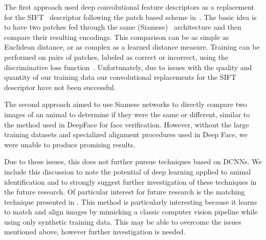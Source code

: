         The first approach used deep convolutional feature descriptors as a replacement for the
        SIFT~\cite{lowe_distinctive_2004} descriptor following the patch based scheme
        in~\cite{zagoruyko_learning_2015}. The basic idea is to have two patches fed through the same
        (Siamese)~\cite{chopra_learning_2005} architecture and then compare their resulting encodings. This
        comparison can be as simple as Euclidean distance, or as complex as a learned distance measure. Training
        can be performed on pairs of patches, labeled as correct or incorrect, using the discriminative loss
        function~\cite{lecun_loss_2005}. Unfortunately, due to issues with the quality and quantity of our training
        data our convolutional replacements for the SIFT descriptor have not been successful.

        The second approach aimed to use Siamese networks to directly compare two images of an animal to determine
        if they were the same or different, similar to the method used in DeepFace\cite{taigman_deepface_2014} for
        face verification. However, without the large training datasets and specialized alignment procedures used
        in Deep Face, we were unable to produce promising results.
        
        Due to these issues, this \thesis{} does not further pursue techniques based on DCNNs.
        We include this discussion to note the potential of deep learning applied to animal identification and to
          strongly suggest further investigation of these techniques in the future research.
        Of particular interest for future research is the matching technique presented in
          \cite{rocco_convolutional_2017}.
        This method is particularly interesting because it learns to match and align images by mimicking a
          classic computer vision pipeline while using only synthetic training data.
        This may be able to overcome the issues mentioned above,
        however further investigation is needed.
